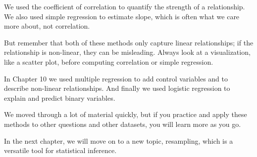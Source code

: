 We used the coefficient of correlation to quantify the strength of a
relationship. We also used simple regression to estimate slope, which is
often what we care more about, not correlation.

But remember that both of these methods only capture linear
relationships; if the relationship is non-linear, they can be
misleading. Always look at a visualization, like a scatter plot, before
computing correlation or simple regression.

In Chapter 10 we used multiple regression to add control variables and
to describe non-linear relationships. And finally we used logistic
regression to explain and predict binary variables.

We moved through a lot of material quickly, but if you practice and
apply these methods to other questions and other datasets, you will
learn more as you go.

In the next chapter, we will move on to a new topic, resampling, which
is a versatile tool for statistical inference.

